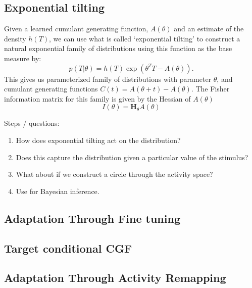 \documentclass[10pt]{article}      %
\begin{document}
\subsection{Exponential tilting}
Given a learned cumulant generating function, $A(\theta)$ and an estimate of the density $h(T)$, we can use what is called `exponential tilting' \cite{morris_natural_1982,morris_unifying_2009} to construct a natural exponential family of distributions using this function as the base measure by:
\begin{equation}
  p(T | \theta) = h(T) \exp( \theta^T T - A(\theta)).
\end{equation}
This gives us parameterized family of distributions with parameter $\theta$, and cumulant generating functions $C(t) = A(\theta +t) - A(\theta)$.
The Fisher information matrix for this family is given by the Hessian of $A(\theta)$ 
\begin{equation}
  I(\theta) = \bm{H}_\theta A(\theta) 
\end{equation}

Steps / questions:
\begin{enumerate}
  \item How does exponential tilting act on the distribution?
  \item Does this capture the distribution given a particular value of the stimulus?
  \item What about if we construct a circle through the activity space?
  \item Use for Bayesian inference.
\end{enumerate}



\subsection{Adaptation Through Fine tuning}





\subsection{Target conditional CGF}





\subsection{Adaptation Through Activity Remapping}
\end{document}
